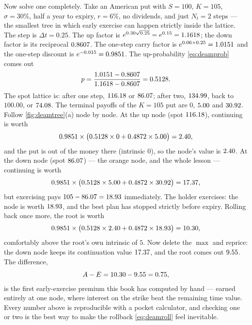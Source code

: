 Now solve one completely.  Take an American put with $S=100$, $K=105$,
$\sigma=30\%$, half a year to expiry, $r=6\%$, no dividends, and just
$N_t=2$ steps --- the smallest tree in which early exercise can
happen strictly inside the lattice.  The step is $\Delta t=0.25$.  The
up factor is $e^{0.30\sqrt{0.25}}=e^{0.15}=1.1618$; the
down factor is its reciprocal $0.8607$.  The one-step
carry factor is $e^{0.06\times0.25}=1.0151$ and the
one-step discount is $e^{-0.015}=0.9851$.  The
up-probability \eqref{eq:deamprob} comes out
\[
p=\frac{1.0151-0.8607}
       {1.1618-0.8607}
 =0.5128 .
\]
The spot lattice is: after one step, $116.18$ or
$86.07$; after two, $134.99$, back to
$100.00$, or $74.08$.  The terminal payoffs of the
$K=105$ put are $0$, $5.00$ and $30.92$.
Follow \cref{fig:deamtree}(a) node by node.  At the up node
(spot $116.18$), continuing is worth
\[
0.9851\times
\big(0.5128\times0
+0.4872\times5.00\big)=2.40 ,
\]
and the put is out of the money there (intrinsic $0$), so the node's
value is $2.40$.  At the down node (spot
$86.07$) --- the orange node, and the whole lesson ---
continuing is worth
\[
0.9851\times\big(0.5128\times5.00
+0.4872\times30.92\big)=17.37 ,
\]
but exercising pays $105-86.07=18.93$
immediately.  The holder exercises: the node is worth
$18.93$, and the best plan has stopped strictly before
expiry.  Rolling back once more, the root is worth
\[
0.9851\times\big(0.5128\times2.40
+0.4872\times18.93\big)=10.30 ,
\]
comfortably above the root's own intrinsic of $5$.  Now delete the
$\max$ and reprice: the down node keeps its continuation value
$17.37$, and the root comes out
$9.55$.  The difference,
\[
A-E=10.30-9.55=0.75 ,
\]
is the first early-exercise premium this book has computed by hand ---
earned entirely at one node, where interest on the strike beat the
remaining time value.  Every number above is
reproducible with a pocket calculator, and checking one or two is the
best way to make the rollback \eqref{eq:deamroll} feel inevitable.

